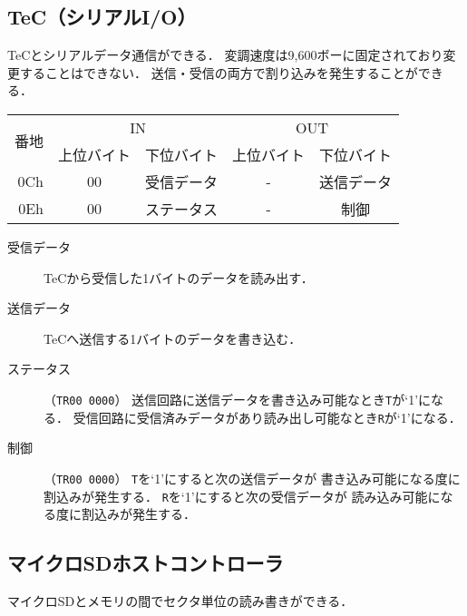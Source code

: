 \subsection{TeC（シリアルI/O）}
TeCとシリアルデータ通信ができる．
変調速度は9,600ボーに固定されており変更することはできない．
送信・受信の両方で割り込みを発生することができる．

\begin{center}
  \small\begin{tabular}{| r | c | c || c | c |}\hline
    \multirow{2}{*}{番地}
    & \multicolumn{2}{|c||}{IN}
    & \multicolumn{2}{c|}{OUT}
    \\\cline{2-5}
         & 上位バイト & 下位バイト & 上位バイト & 下位バイト
    \\\hline\hline
    0Ch  &  00 & 受信データ
         &  -  & 送信データ \\\hline
    0Eh  &  00 & ステータス
         &  -  & 制御 \\\hline
  \end{tabular}
\end{center}

\begin{description}
\item[受信データ]
  TeCから受信した1バイトのデータを読み出す．
\item[送信データ]
  TeCへ送信する1バイトのデータを書き込む．
\item[ステータス]（\texttt{TR00 0000}）
  送信回路に送信データを書き込み可能なとき\texttt{T}が`1'になる．
  受信回路に受信済みデータがあり読み出し可能なとき\texttt{R}が`1'になる．
\item[制御]（\texttt{TR00 0000}）
  \texttt{T}を`1'にすると次の送信データが
  書き込み可能になる度に割込みが発生する．
  \texttt{R}を`1'にすると次の受信データが
  読み込み可能になる度に割込みが発生する．
\end{description}

\subsection{マイクロSDホストコントローラ}
マイクロSDとメモリの間でセクタ単位の読み書きができる．


